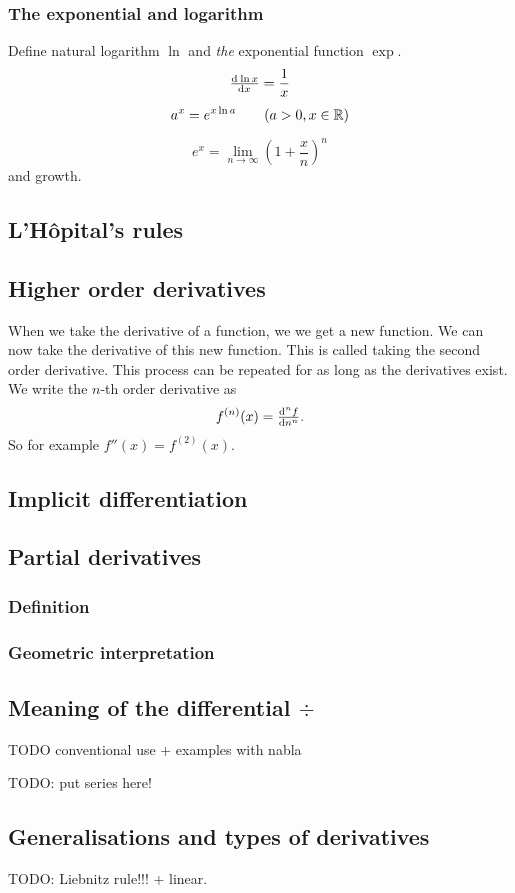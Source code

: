 \subsubsection{The exponential and logarithm}
Define natural logarithm $\ln$ and \textit{the} exponential function $\exp$.
\[ \od{\ln x}{x} = \frac{1}{x} \]
\[ a^x = e^{x\ln a} \qquad (a>0, x\in \mathbb{R}) \]

\[ e^x = \lim_{n\to \infty}\left(1+\frac{x}{n}\right)^n \]
and growth.

\subsection{L'Hôpital's rules}


\subsection{Higher order derivatives}
When we take the derivative of a function, we we get a new function. We can now take the derivative of this new function. This is called taking the second order derivative. This process can be repeated for as long as the derivatives exist. We write the $n$-th order derivative as
\[ f^{(n)}(x) = \od[n]{f}{n}. \]
So for example $f''(x) = f^{(2)}(x)$.

\subsection{Implicit differentiation}

\subsection{Partial derivatives}
\subsubsection{Definition}
\subsubsection{Geometric interpretation}

\subsection{Meaning of the differential $\div{}$}
TODO conventional use + examples with nabla

TODO: put series here!

\subsection{Generalisations and types of derivatives}
TODO: Liebnitz rule!!! + linear.

